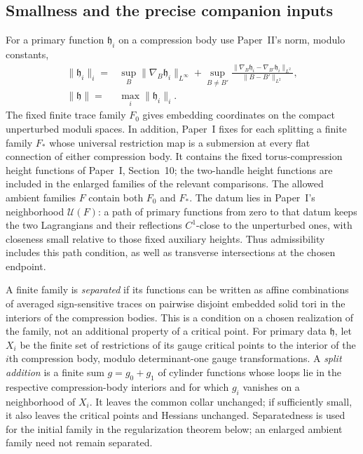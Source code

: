 \documentclass[11pt]{amsart}
\theoremstyle{definition}
\theoremstyle{remark}
\theoremstyle{plain}
\begin{document}
\subsection{Smallness and the precise companion inputs}
For a primary function $\mathfrak h_i$ on a compression body use
Paper~II's norm, modulo constants,
\begin{align*}
 \|\mathfrak h_i\|_i={}&
 \sup_B\|\nabla_B\mathfrak h_i\|_{L^\infty}
 +\sup_{B\ne B'}
 \frac{\|\nabla_B\mathfrak h_i-\nabla_{B'}\mathfrak h_i\|_{L^2}}
 {\|B-B'\|_{L^2}},\\
 \|\mathfrak h\|={}&\max_i\|\mathfrak h_i\|_i.
\end{align*}
The fixed finite trace family $F_0$ gives embedding coordinates on
the compact unperturbed moduli spaces. In addition, Paper~I fixes
for each splitting a finite family $F_*$ whose universal restriction
map is a submersion at every flat connection of either compression
body. It contains the fixed torus-compression height functions of
Paper~I, Section~10; the two-handle height functions are included
in the enlarged families of the relevant comparisons.
The allowed ambient families $F$ contain both
$F_0$ and $F_*$. The datum lies in Paper~I's neighborhood
$\mathcal U(F)$: a path of primary functions from zero to that datum
keeps the two Lagrangians and their reflections $C^1$-close to the
unperturbed ones, with closeness small relative to those fixed
auxiliary heights. Thus admissibility includes this path condition,
as well as transverse intersections at the chosen endpoint.

A finite family is \emph{separated} if its functions can be written
as affine combinations of averaged sign-sensitive traces on pairwise
disjoint embedded solid tori in the interiors of the compression
bodies. This is a condition on a chosen realization of the family,
not an additional property of a critical point. For primary data
$\mathfrak h$, let $X_i$ be the finite set of restrictions of its gauge
critical points to the interior of the $i$th compression body, modulo
determinant-one gauge transformations. A \emph{split addition} is a
finite sum $g=g_0+g_1$ of cylinder functions whose loops lie in the
respective compression-body interiors and for which $g_i$ vanishes
on a neighborhood of $X_i$. It leaves the common collar unchanged;
if sufficiently small, it also leaves the critical points and Hessians
unchanged. Separatedness
is used for the initial family in the regularization theorem below;
an enlarged ambient family need not remain separated.
\end{document}
